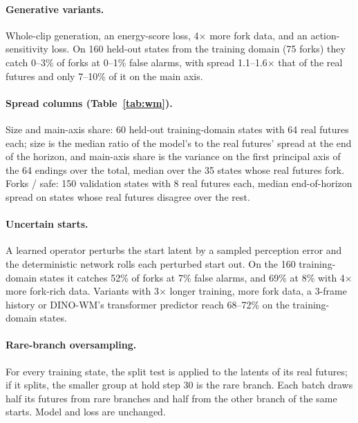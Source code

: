 \documentclass{article}
\begin{document}
\paragraph{Generative variants.} Whole-clip generation, an energy-score loss, 4$\times$ more fork data,
and an action-sensitivity loss. On 160 held-out states from the training domain (75 forks) they catch
0--3\% of forks at 0--1\% false alarms, with spread 1.1--1.6$\times$ that of the real futures and only
7--10\% of it on the main axis.

\paragraph{Spread columns (Table~\ref{tab:wm}).} Size and main-axis share: 60 held-out training-domain
states with 64 real futures each; size is the median ratio of the model's to the real futures' spread at
the end of the horizon, and main-axis share is the variance on the first principal axis of the 64 endings
over the total, median over the 35 states whose real futures fork. Forks / safe: 150 validation states
with 8 real futures each, median end-of-horizon spread on states whose real futures disagree over the rest.

\paragraph{Uncertain starts.} A learned operator perturbs the start latent by a sampled perception error
and the deterministic network rolls each perturbed start out. On the 160 training-domain states it
catches 52\% of forks at 7\% false alarms, and 69\% at 8\% with 4$\times$ more fork-rich data. Variants with 3$\times$ longer training, more fork data, a 3-frame history
or DINO-WM's transformer predictor \citep{zhou2025dinowm} reach 68--72\% on the training-domain states.

\paragraph{Rare-branch oversampling.} For every training state, the split test is applied to the latents
of its real futures; if it splits, the smaller group at hold step 30 is the rare branch. Each batch draws
half its futures from rare branches and half from the other branch of the same starts. Model and loss are
unchanged.
\end{document}
